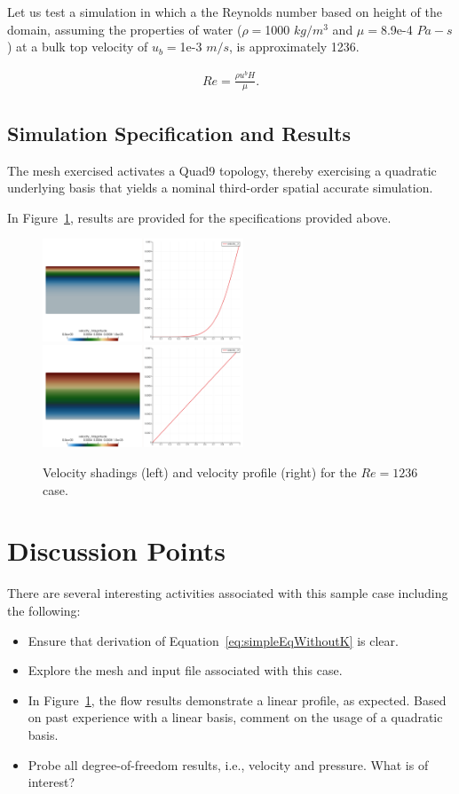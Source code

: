 \documentclass{article}
\begin{document}
Let us test a simulation in which a the Reynolds number based on height of the domain,
assuming the properties of water ($\rho = $1000 $kg/m^3$ and $\mu = $8.9e-4 $Pa-s$)
at a bulk top velocity of $u_b = $1e-3 $m/s$, is approximately 1236.

\begin{align}
  Re = \frac{\rho u^b H}{\mu}.
\label{eq:muForm}
\end{align}

\subsection{Simulation Specification and Results}

The mesh exercised activates a Quad9 topology, thereby exercising a
quadratic underlying basis that yields a nominal third-order spatial accurate
simulation.

In Figure~\ref{fig:results}, results are provided for the specifications
provided above.

\begin{figure}[!htbp]
  \subfloat[]
  \centering
  {
   \includegraphics[height=1.2in]{images/2d_quad9_couette_results_early.png}
  }
  \subfloat[]
  \centering
  {
   \includegraphics[height=1.2in]{images/2d_quad9_couette_results_late.png}
  }
  \caption{Velocity shadings (left) and velocity profile (right) for the $Re = 1236$ case.}
  \label{fig:results}
\end{figure}

\section{Discussion Points}

There are several interesting activities associated with this sample case including
the following:

\begin{itemize}
	\item Ensure that derivation of Equation~\ref{eq:simpleEqWithoutK} is clear.
	\item Explore the mesh and input file associated with this case.
	\item In Figure~\ref{fig:results}, the flow results demonstrate a linear profile, as 
          expected. Based on past experience with a linear basis, comment on the usage of a quadratic
          basis.
        \item Probe all degree-of-freedom results, i.e., velocity and pressure. What is of interest?
\end{itemize}
\end{document}
